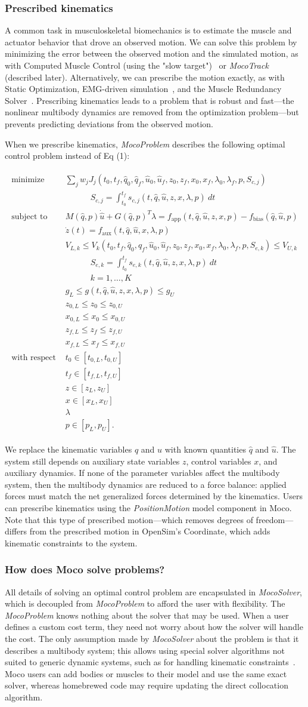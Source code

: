 \documentclass[10pt,letterpaper]{article}
\newcommand{\prescribed}{
\begin{align}
    \begin{aligned}
        \mbox{minimize} \quad & \sum_j w_j J_{j}(t_0, t_f, \hat{q}_0, \hat{q}_f, \hat{u}_0, \hat{u}_f, z_0, z_f, x_{0}, x_{f}, \lambda_0, \lambda_f, p, S_{c,j}) \\
        & \quad\quad\quad S_{c,j} = \int_{t_0}^{t_f} s_{c,j}(t, \hat{q}, \hat{u}, z, x, \lambda, p)~dt \\
        \mbox{subject to} \quad &
         M(\hat{q}, p)\dot{\hat{u}} + G(\hat{q}, p)^T \lambda = f_{\textrm{app}}(t, \hat{q}, \hat{u}, z, x, p) - f_{\textrm{bias}}(\hat{q}, \hat{u}, p) \\
         & \dot{z}(t) = f_{\textrm{aux}}(t, \hat{q}, \hat{u}, x, \lambda, p) \\
         & V_{L,k} \leq V_k(t_0, t_f, \hat{q}_0, \hat{q}_f, \hat{u}_0, \hat{u}_f, z_0, z_f, x_{0}, x_{f}, \lambda_0, \lambda_f, p, S_{e,k}) \leq V_{U,k} \\
        & \quad\quad\quad S_{e,k} = \int_{t_0}^{t_f} s_{e,k}(t, \hat{q}, \hat{u}, z, x, \lambda, p)~dt \\
         & \quad\quad\quad k = 1, \ldots, K \\
        & g_{L} \leq g(t, \hat{q}, \hat{u}, z, x, \lambda, p) \leq g_{U} \\
         & z_{0,L} \leq z_0 \leq z_{0,U} \\
         & x_{0,L} \leq x_0 \leq x_{0,U} \\
         & z_{f,L} \leq z_f \leq z_{f,U} \\
         & x_{f,L} \leq x_f \leq x_{f,U} \\
         \mbox{with respect to} \quad
         & t_0 \in [t_{0,L}, t_{0,U}] \\
         & t_f \in [t_{f,L}, t_{f,U}] \\
         & z \in [z_{L}, z_{U}] \\
         & x \in [x_{L}, x_{U}] \\
         & \lambda \\
         & p \in [p_{L}, p_{U}].
    \end{aligned}
\end{align}
}
\begin{document}
\subsubsection*{Prescribed kinematics}

A common task in musculoskeletal biomechanics is to estimate the muscle and actuator behavior that drove an observed motion. We can solve this problem by minimizing the error between the observed motion and the simulated motion, as with Computed Muscle Control (using the "slow target")~\cite{Thelen:2003bba} or \textit{MocoTrack} (described later). Alternatively, we can prescribe the motion exactly, as with Static Optimization, EMG-driven simulation~\cite{Lloyd:2003}, and the Muscle Redundancy Solver~\cite{Groote:2016dq}. Prescribing kinematics leads to a problem that is robust and fast---the nonlinear multibody dynamics are removed from the optimization problem---but prevents predicting deviations from the observed motion.

When we prescribe kinematics, \textit{MocoProblem} describes the following optimal control problem instead of Eq (1):

\prescribed

We replace the kinematic variables $q$ and $u$ with known quantities $\hat{q}$ and $\hat{u}$. The system still depends on auxiliary state variables $z$, control variables $x$, and auxiliary dynamics. If none of the parameter variables affect the multibody system, then the multibody dynamics are reduced to a force balance: applied forces must match the net generalized forces determined by the kinematics. Users can prescribe kinematics using the \textit{PositionMotion} model component in Moco. Note that this type of prescribed motion---which removes degrees of freedom---differs from the prescribed motion in OpenSim’s Coordinate, which adds kinematic constraints to the system.

\subsubsection*{How does Moco solve problems?}

All details of solving an optimal control problem are encapsulated in \textit{MocoSolver}, which is decoupled from \textit{MocoProblem} to afford the user with flexibility. The \textit{MocoProblem} knows nothing about the solver that may be used. When a user defines a custom cost term, they need not worry about how the solver will handle the cost. The only assumption made by \textit{MocoSolver} about the problem is that it describes a multibody system; this allows using special solver algorithms not suited to generic dynamic systems, such as for handling kinematic constraints~\cite{Posa:2016}. Moco users can add bodies or muscles to their model and use the same exact solver, whereas homebrewed code may require updating the direct collocation algorithm.
\end{document}
